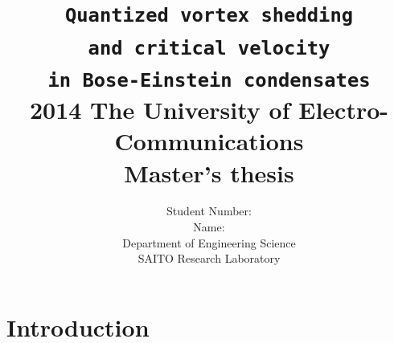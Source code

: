 \documentclass[12pt,a4paper]{report} %
\title{
{\Huge \tt Quantized vortex shedding
\\ and critical velocity
\\in Bose-Einstein condensates} \\[1cm]
{\Large 2014 The University of Electro-Communications \\
Master's thesis} \\[1cm]
}
\author{
\LARGE Student Number: \fbox{1133026} \\[0.5cm]
\LARGE Name: \fbox{Tsuyoshi Kadokura } \\[0.5cm]
\LARGE Department of Engineering Science \\[0.5cm]
\LARGE SAITO Research Laboratory \\[0.5cm]
\date{}
}
\begin{document}
\maketitle


\makeatletter
\def\ps@fancy{%
\def\chaptermark##1{\markboth{\ifnum \c@secnumdepth>\z@ \thechapter\hskip 0.5em\relax \fi ##1}{}}%
\def\sectionmark##1{\markright {\ifnum \c@secnumdepth >\@ne \thesection\hskip 0.5em\relax \fi ##1}}%
\ps@@fancy
\gdef\ps@fancy{\@fancyplainfalse\ps@@fancy}%
\ifdim\headwidth<0sp
\global\advance\headwidth123456789sp\global\advance\headwidth\textwidth
\fi
}
\makeatother




\pagestyle{fancy} %

\tableofcontents
\setcounter{page}{1}

\lhead{\thepage}
\cfoot{\thepage} %


\chapter{Introduction}
\end{document}
